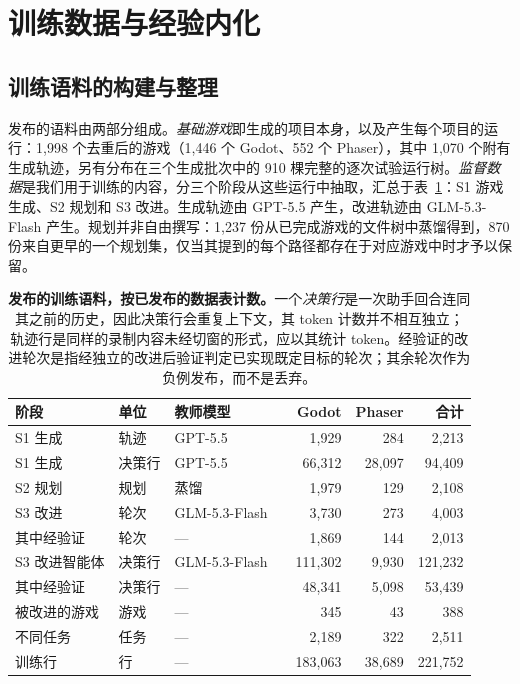 \section{训练数据与经验内化}\label{app:train}
\subsection{训练语料的构建与整理}\label{app:corpus}
发布的语料由两部分组成。\emph{基础游戏}即生成的项目本身，以及产生每个项目的运行：1,998 个去重后的游戏（1,446 个 Godot、552 个 Phaser），其中 1,070 个附有生成轨迹，另有分布在三个生成批次中的 910 棵完整的逐次试验运行树。\emph{监督数据}是我们用于训练的内容，分三个阶段从这些运行中抽取，汇总于表~\ref{tab:corpus}：S1 游戏生成、S2 规划和 S3 改进。生成轨迹由 GPT-5.5 产生，改进轨迹由 GLM-5.3-Flash 产生。规划并非自由撰写：1,237 份从已完成游戏的文件树中蒸馏得到，870 份来自更早的一个规划集，仅当其提到的每个路径都存在于对应游戏中时才予以保留。

\begin{table}[htbp]
\caption{\textbf{发布的训练语料，按已发布的数据表计数。}一个\emph{决策行}是一次助手回合连同其之前的历史，因此决策行会重复上下文，其 token 计数并不相互独立；轨迹行是同样的录制内容未经切窗的形式，应以其统计 token。经验证的改进轮次是指经独立的改进后验证判定已实现既定目标的轮次；其余轮次作为负例发布，而不是丢弃。}
\label{tab:corpus}
\centering\small
\begin{tabular}{@{}llllrrr@{}}
\toprule
阶段 & 单位 & 教师模型 & & Godot & Phaser & 合计 \\
\midrule
S1 生成 & 轨迹 & GPT-5.5 & & 1,929 & 284 & 2,213 \\
S1 生成 & 决策行 & GPT-5.5 & & 66,312 & 28,097 & 94,409 \\
S2 规划 & 规划 & 蒸馏 & & 1,979 & 129 & 2,108 \\
S3 改进 & 轮次 & GLM-5.3-Flash & & 3,730 & 273 & 4,003 \\
\quad 其中经验证 & 轮次 & — & & 1,869 & 144 & 2,013 \\
S3 改进智能体 & 决策行 & GLM-5.3-Flash & & 111,302 & 9,930 & 121,232 \\
\quad 其中经验证 & 决策行 & — & & 48,341 & 5,098 & 53,439 \\
\midrule
被改进的游戏 & 游戏 & — & & 345 & 43 & 388 \\
不同任务 & 任务 & — & & 2,189 & 322 & 2,511 \\
训练行 & 行 & — & & 183,063 & 38,689 & 221,752 \\
\bottomrule
\end{tabular}
\end{table}

